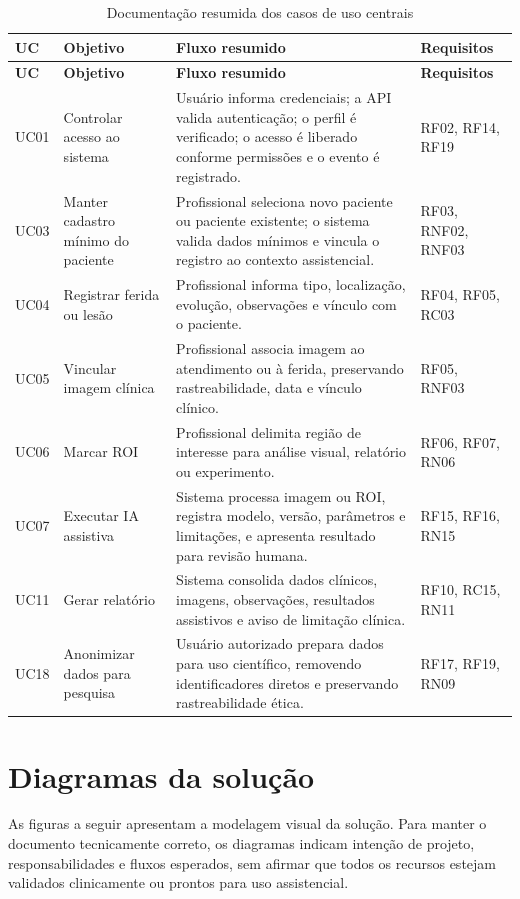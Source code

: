 \documentclass[
    12pt,
    oneside,
    a4paper,
    chapter=TITLE,
    brazil,
    sumario=tradicional,
    hidelinks
]{abntex2}
\begin{document}
\begin{longtable}{L{1.5cm}L{4.1cm}L{5.4cm}L{2.4cm}}
\caption{\label{tab:documentacao-casos-uso}Documentação resumida dos casos de uso centrais}\\
\toprule
\textbf{UC} & \textbf{Objetivo} & \textbf{Fluxo resumido} & \textbf{Requisitos} \\
\midrule
\endfirsthead
\toprule
\textbf{UC} & \textbf{Objetivo} & \textbf{Fluxo resumido} & \textbf{Requisitos} \\
\midrule
\endhead
UC01 & Controlar acesso ao sistema & Usuário informa credenciais; a API valida autenticação; o perfil é verificado; o acesso é liberado conforme permissões e o evento é registrado. & RF02, RF14, RF19 \\
UC03 & Manter cadastro mínimo do paciente & Profissional seleciona novo paciente ou paciente existente; o sistema valida dados mínimos e vincula o registro ao contexto assistencial. & RF03, RNF02, RNF03 \\
UC04 & Registrar ferida ou lesão & Profissional informa tipo, localização, evolução, observações e vínculo com o paciente. & RF04, RF05, RC03 \\
UC05 & Vincular imagem clínica & Profissional associa imagem ao atendimento ou à ferida, preservando rastreabilidade, data e vínculo clínico. & RF05, RNF03 \\
UC06 & Marcar ROI & Profissional delimita região de interesse para análise visual, relatório ou experimento. & RF06, RF07, RN06 \\
UC07 & Executar IA assistiva & Sistema processa imagem ou ROI, registra modelo, versão, parâmetros e limitações, e apresenta resultado para revisão humana. & RF15, RF16, RN15 \\
UC11 & Gerar relatório & Sistema consolida dados clínicos, imagens, observações, resultados assistivos e aviso de limitação clínica. & RF10, RC15, RN11 \\
UC18 & Anonimizar dados para pesquisa & Usuário autorizado prepara dados para uso científico, removendo identificadores diretos e preservando rastreabilidade ética. & RF17, RF19, RN09 \\
\bottomrule
\end{longtable}

\section{Diagramas da solução}

As figuras a seguir apresentam a modelagem visual da solução. Para manter o documento tecnicamente correto, os diagramas indicam intenção de projeto, responsabilidades e fluxos esperados, sem afirmar que todos os recursos estejam validados clinicamente ou prontos para uso assistencial.
\end{document}
